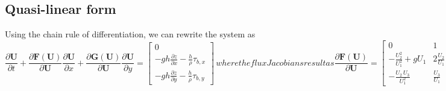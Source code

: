\documentclass[10pt,a4paper]{article}
\begin{document}
	\subsection{Quasi-linear form}
	Using the chain rule of differentiation, we can rewrite the system as
	\begin{subequations}
		\begin{equation}
		\frac{\partial \boldsymbol{U}}{\partial t} + \frac{\partial \boldsymbol{F}(\boldsymbol{U})}{\partial \boldsymbol{U}}\frac{\partial \boldsymbol{U}}{\partial x} + \frac{\partial \boldsymbol{G}(\boldsymbol{U})}{\partial \boldsymbol{U}}\frac{\partial \boldsymbol{U}}{\partial y} = \begin{bmatrix}
		0 \\ -g h \frac{\partial z}{\partial x} - \frac{h}{\rho}\tau_{b,x} \\ -g h \frac{\partial z}{\partial y} - \frac{h}{\rho}\tau_{b,y}
		\end{bmatrix}\,
		\end{equation}
		where the flux Jacobians result as
		\begin{equation}
		\frac{\partial \boldsymbol{F}(\boldsymbol{U})}{\partial \boldsymbol{U}} = \begin{bmatrix}
		0 & 1 & 0 \\ -\frac{U_2^2}{U_1^2} + g U_1 & 2\frac{U_2}{U_1} & 0 \\ -\frac{U_2\,U_3}{U_1^2} & \frac{U_3}{U_1} & \frac{U_2}{U_1}
		\end{bmatrix} = \begin{bmatrix}
		0 & 1 & 0 \\ gh - u^2 & 2 u & 0 \\ -u v & v & u
		\end{bmatrix} 
		\end{equation}
		and
		\begin{equation}
		\frac{\partial\boldsymbol{G}(\boldsymbol{U})}{\partial \boldsymbol{U}} = \begin{bmatrix}
		0 & 0 & 1  \\ -\frac{U_2\,U_3}{U_1^2} & \frac{U_3}{U_1} & \frac{U_2}{U_1}\\ -\frac{U_3^2}{U_1^2} + g U_1 & 0 & 2\frac{U_3}{U_1}
		\end{bmatrix} = \begin{bmatrix}
		0 & 0 & 1  \\ -u v & v & u \\ g h-v^2 & 0 & 2 v
		\end{bmatrix} \,.
		\end{equation}
		\label{eq:shallow_water_equations_quasi-linear_form}
	\end{subequations}
\end{document}

